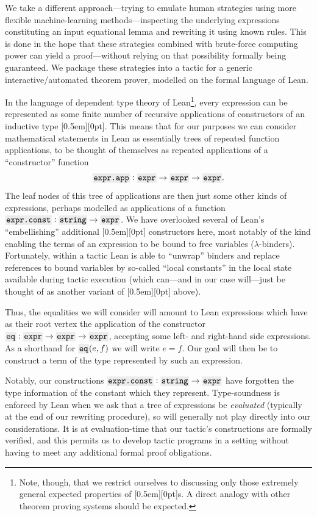 \documentclass[a4paper]{article}
\theoremstyle{plain}
\theoremstyle{definition}
\newcommand{\xx}[1]{{\colorbox{gray!15}{\raisebox{0em}[0.5em][0pt]{\makebox[\width-0.4em]{\texttt{#1}}}}}}
\newcommand{\expr}{\xx{expr}}
\begin{document}
We take a different approach---trying to emulate human strategies using more flexible machine-learning methods---inspecting the underlying expressions constituting an input equational lemma and rewriting it using known rules. This is done in the hope that these strategies combined with brute-force computing power can yield a proof---without relying on that possibility formally being guaranteed. We package these strategies into a tactic for a generic interactive/automated theorem prover, modelled on the formal language of Lean.

In the language of dependent type theory of Lean\footnote{Note, though, that we restrict ourselves to discussing only those extremely general expected properties of \expr{}s. A direct analogy with other theorem proving systems should be expected.}, every expression can be represented as some finite number of recursive applications of constructors of an inductive type \expr{}. This means that for our purposes we can consider mathematical statements in Lean as essentially trees of repeated function applications, to be thought of themselves as repeated applications of a ``constructor'' function
\begin{equation*}
  \xx{expr.app} : \expr{} \to \expr{} \to \expr{}.
\end{equation*}
The leaf nodes of this tree of applications are then just some other kinds of expressions, perhaps modelled as applications of a function $\xx{expr.const} : \xx{string} \to \expr{}$. We have overlooked several of Lean's ``embellishing'' additional \xx{expr.*} constructors here, most notably of the kind enabling the terms of an expression to be bound to free variables ($\lambda$-binders). Fortunately, within a tactic Lean is able to ``unwrap'' binders and replace references to bound variables by so-called ``local constants'' in the local state available during tactic execution (which can---and in our case will---just be thought of as another variant of \xx{expr.const} above).

Thus, the equalities we will consider will amount to Lean expressions which have as their root vertex the application of the constructor $\xx{eq} : \expr{} \to \expr{} \to \expr{}$, accepting some left- and right-hand side expressions. As a shorthand for $\xx{eq}(e, f)$ we will write $e = f$. Our goal will then be to construct a term of the type represented by such an expression.

Notably, our constructions $\xx{expr.const} : \xx{string} \to \expr{}$ have forgotten the type information of the constant which they represent. Type-soundness is enforced by Lean when we ask that a tree of expressions be \textit{evaluated} (typically at the end of our rewriting procedure), so will generally not play directly into our considerations. It is at evaluation-time that our tactic's constructions are formally verified, and this permits us to develop tactic programs in a setting without having to meet any additional formal proof obligations.
\end{document}
